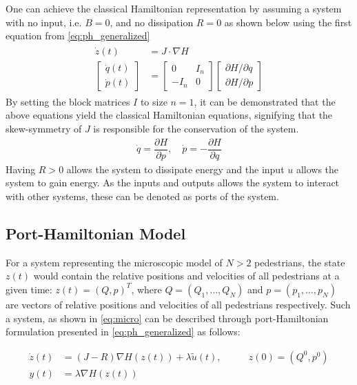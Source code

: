 One can achieve the classical Hamiltonian representation by assuming a system with no input, i.e. $B = 0$, and  no dissipation $R = 0$ as shown below using the first equation from \autoref{eq:ph_generalized}
\begin{gather}
    \begin{aligned}
    \dot z(t) &= J \cdot \nabla H \\
    \begin{bmatrix}
        \dot q(t) \\ \dot p(t)
    \end{bmatrix}
    &=
    \begin{bmatrix}
        0 & I_n \\ 
        -I_n & 0
    \end{bmatrix}
    \begin{bmatrix}
        \partial H / \partial q \\
        \partial H / \partial p
    \end{bmatrix} 
    \end{aligned}
    \label{eq:conservative}
\end{gather}
By setting the block matrices $I$ to size $n=1$, it can be demonstrated that the above equations yield the classical Hamiltonian equations, signifying that the skew-symmetry of $J$ is responsible for the conservation of the system.
\begin{align*}
\dot q = \dfrac{\partial H}{\partial p}, \quad \dot p = -\dfrac{\partial H}{\partial q}
\end{align*}
Having $R > 0$ allows the system to dissipate energy and the input $u$ allows the system to gain energy. As the inputs and outputs allows the system to interact with other systems, these can be denoted as ports of the system.

\subsection{Port-Hamiltonian Model}
For a system representing the microscopic model of $N > 2$ pedestrians, the state $z(t)$ would contain the relative positions and velocities of all pedestrians at a given time: $z(t) = (Q,p)^T$, where $Q = (Q_1,\dots,Q_N)$ and $p = (p_1,\dots,p_N)$ are vectors of relative positions and velocities of all pedestrians respectively. Such a system, as shown in \autoref{eq:micro} can be described through port-Hamiltonian formulation presented in \autoref{eq:ph_generalized} as follows:

\begin{equation}
    \begin{aligned}
        \dot z(t) &= (J-R)\nabla H(z(t)) + \lambda \tilde u(t), &\qquad z(0) = (Q^0,p^0)\\
        y(t) &= \lambda \nabla H(z(t)) 
    \end{aligned}
    \label{eq:ph_model}
\end{equation}

